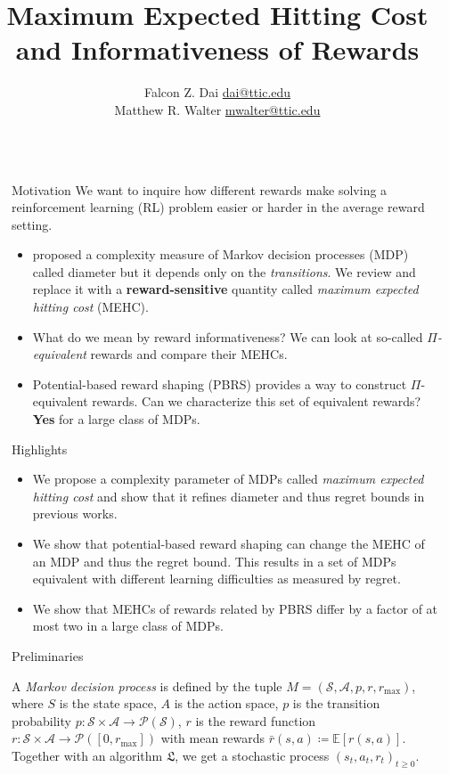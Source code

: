 \documentclass[final]{beamer}
\title{Maximum Expected Hitting Cost and Informativeness of Rewards}
\author{Falcon Z. Dai \hspace{4.5em} \url{dai@ttic.edu} \\ 
Matthew R. Walter \hspace{2em} \url{mwalter@ttic.edu}}
\institute[TTI-Chicago]{Toyota Technological Institute at Chicago}
\newcommand{\Exp}{\mathbb{E}}
\newlength{\sepwidth}
\newlength{\colwidth}
\newcommand{\separatorcolumn}{\begin{column}{\sepwidth}\end{column}}
\begin{document}
\begin{frame}[t]

\begin{columns}[t]
\separatorcolumn

\begin{column}{\colwidth}

  \begin{block}{Motivation}
  We want to inquire how different rewards make solving a reinforcement learning (RL) problem easier or harder in the average reward setting.
    \begin{itemize}
        \item \cite{jaksch2010near} proposed a complexity measure of Markov decision processes (MDP) called diameter but it depends only on the \emph{transitions}. We review and replace it with a \textbf{reward-sensitive} quantity called \emph{maximum expected hitting cost} (MEHC).
        \item What do we mean by reward informativeness? We can look at so-called \emph{$\Pi$-equivalent} rewards and compare their MEHCs.
        \item Potential-based reward shaping (PBRS) \cite{ng1999policy} provides a way to construct $\Pi$-equivalent rewards. Can we characterize this set of equivalent rewards? \textbf{Yes} for a large class of MDPs.
    \end{itemize}
  \end{block}

  \begin{alertblock}{Highlights}
    \begin{itemize}
      \item We propose a complexity parameter of MDPs called \textit{maximum expected hitting cost} and show that it refines diameter and thus regret bounds in previous works. 
      \item We show that potential-based reward shaping can change the MEHC of an MDP and thus the regret bound. This results in a set of MDPs equivalent with different learning difficulties as measured by regret. 
      \item We show that MEHCs of rewards related by PBRS differ by a factor of at most two in a large class of MDPs.
    \end{itemize}

  \end{alertblock}

  \begin{block}{Preliminaries}
    
    A \textit{Markov decision process} is defined by the tuple $M = (\mathcal{S}, \mathcal{A}, p, r, r_\text{max})$, where $S$ is the state space, $A$ is the action space, $p$ is the transition probability $p : \mathcal{S}\times \mathcal{A} \rightarrow \mathcal{P}(\mathcal{S})$, $r$ is the reward function $r : \mathcal{S} \times \mathcal{A} \rightarrow \mathcal{P}([0, r_\text{max}])$ with mean rewards $\bar{r}(s, a) \coloneqq \Exp[r(s, a)]$. Together with an algorithm $\mathfrak{L}$, we get a stochastic process $(s_t, a_t, r_t)_{t \geq 0}$.
  

\end{block}
\end{column}
\end{columns}
\end{frame}
\end{document}
